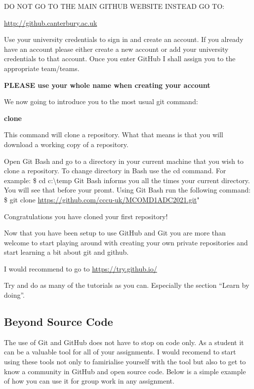 \documentclass[
]{book}
\begin{document}
DO NOT GO TO THE MAIN GITHUB WEBSITE INSTEAD GO TO:

\url{http://github.canterbury.ac.uk}

Use your university credentials to sign in and create an account. If you already have an account please either create a new account or add your university credentials to that account. Once you enter GitHub I shall assign you to the appropriate team/teams.

\textbf{PLEASE use your whole name when creating your account}

We now going to introduce you to the most usual git command:

\textbf{clone}

This command will clone a repository. What that means is that you will download a working copy of a repository.

Open Git Bash and go to a directory in your current machine that you wish to clone a repository.
To change directory in Bash use the cd command.
For example:
\$ cd c:\textbackslash temp
Git Bash informs you all the times your current directory. You will see that before your promt.
Using Git Bash run the following command:
\$ git clone \url{https://github.com/cccu-uk/MCOMD1ADC2021.git}"

Congratulations you have cloned your first repository!

Now that you have been setup to use GitHub and Git you are more than welcome to start playing around with creating your own private repositories and start learning a bit about git and github.

I would recommend to go to
\url{https://try.github.io/}

Try and do as many of the tutorials as you can. Especially the section ``Learn by doing''.

\hypertarget{beyond-source-code}{%
\subsection*{Beyond Source Code}\label{beyond-source-code}}

The use of Git and GitHub does not have to stop on code only. As a student it can be a valuable tool for all of your assignments. I would recomend to start using these tools not only to famirialise yourself with the tool but also to get to know a community in GitHub and open source code.
Below is a simple example of how you can use it for group work in any assignment.
\end{document}
